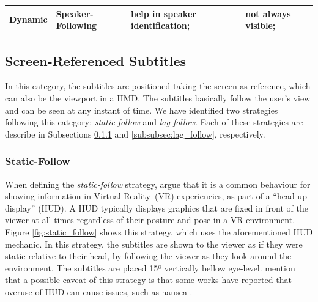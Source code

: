 \begin{table}[!ht]
\begin{tabular}{@{}llll@{}}
\textbf{Dynamic}                                                & Speaker-Following  & help in speaker identification;                                                                        & not always visible;                                                                                            \\ \bottomrule
\end{tabular}
\end{table}
\endgroup

\subsection{Screen-Referenced Subtitles}
\label{subsec:screen_referenced}
In this category, the subtitles are positioned taking the screen as reference, which can also be the viewport in a HMD. The subtitles basically follow the user's view and can be seen at any instant of time. We have identified two strategies following this category: \emph{static-follow} and \emph{lag-follow}. Each of these strategies are describe in Subsections \ref{subsubsec:static_follow} and \ref{subsubsec:lag_follow}, respectively.

\subsubsection{Static-Follow}
\label{subsubsec:static_follow}

When defining the \emph{static-follow} strategy,  argue that it is a common behaviour for showing information in Virtual Reality~(VR) experiencies, as part of a ``head-up display'' (HUD). A HUD typically displays graphics that are fixed in front of the viewer at all times regardless of their posture and pose in a VR environment. Figure \ref{fig:static_follow} shows this strategy, which uses the aforementioned HUD mechanic. In this strategy, the subtitles are shown to the viewer as if they were static relative to their head, by following the viewer as they look around the environment. The subtitles are placed 15º vertically bellow eye-level.  mention that a possible caveat of this strategy is that some works have reported that overuse of HUD can cause issues, such as nausea \cite{laviola2000discussion, sharples2008virtual}.

